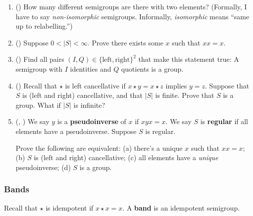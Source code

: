 \documentclass[11pt,paper=letter]{scrartcl}
\begin{document}
\begin{enumerate}
\item (\href{https://en.wikipedia.org/wiki/Semigroup_with_two_elements}{\!}) How many different semigroups are there with two elements? (Formally, I have to say \textit{non-isomorphic} semigroups. Informally, \textit{isomorphic} means ``same up to relabelling.'')

\item (\href{https://proofwiki.org/wiki/Element_has_Idempotent_Power_in_Finite_Semigroup}{\!}) Suppose $0 < |S| < \infty$. Prove there exists some $x$ such that $xx = x$.

\item (\href{https://math.stackexchange.com/a/4250000/680415}{\!}) Find all pairs $(I, Q) \in \{\text{left}, \text{right}\}^2$ that make this statement true: A semigroup with $I$ identities and $Q$ quotients is a group.

\item (\href{https://math.stackexchange.com/a/203029/680415}{\!}) Recall that $\star$ is left cancellative if $x \star y = x \star z$ implies $y = z$. Suppose that $S$ is (left and right) cancellative, and that $|S|$ is finite. Prove that $S$ is a group. What if $|S|$ is infinite?

\item (\href{https://math.stackexchange.com/q/2282063/680415}{\!}, \href{https://math.stackexchange.com/q/253514/680415}{\!}) We say $y$ is a \textbf{pseudoinverse} of $x$ if $xyx = x$. We say $S$ is \textbf{regular} if all elements have a pseudoinverse. Suppose $S$ is regular.

Prove the following are equivalent: (a) there's a unique $x$ such that $xx = x$; (b) $S$ is (left and right) cancellative; (c) all elements have a \textit{unique} pseudoinverse; (d) $S$ is a group.
\end{enumerate}

\subsubsection*{Bands}

Recall that $\star$ is idempotent if $x \star x = x$. A \textbf{band} is an idempotent semigroup.
\end{document}
